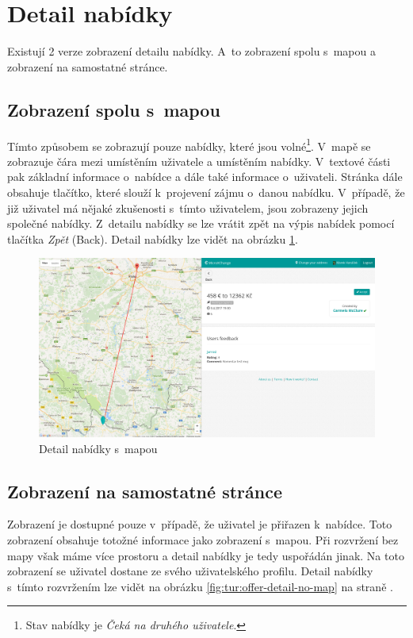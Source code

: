 \section{Detail nabídky}

\label{nur:detail}

Existují 2 verze zobrazení detailu nabídky. A~to zobrazení spolu s~mapou a zobrazení na samostatné stránce.

\subsection{Zobrazení spolu s~mapou}
Tímto způsobem se zobrazují pouze nabídky, které jsou volné\footnote{Stav nabídky je \textit{Čeká na druhého uživatele}.}. V~mapě se zobrazuje čára mezi umístěním uživatele a umístěním nabídky. V~textové části pak základní informace o~nabídce a dále také informace o~uživateli. Stránka dále obsahuje tlačítko, které slouží k~projevení zájmu o~danou nabídku. V~případě, že již uživatel má nějaké zkušenosti s~tímto uživatelem, jsou zobrazeny jejich společné nabídky. Z~detailu nabídky se lze vrátit zpět na výpis nabídek pomocí tlačítka \textit{Zpět} (Back). Detail nabídky lze vidět na obrázku \ref{fig:tur:offer-detail-map}.

\begin{figure}[!h]
    \centering
    \includegraphics[width=1.0\textwidth]{media/tur/offer-detail-map.png}
    \caption{Detail nabídky s~mapou}
    \label{fig:tur:offer-detail-map}
\end{figure}

\subsection{Zobrazení na samostatné stránce}
Zobrazení je dostupné pouze v~případě, že uživatel je přiřazen k~nabídce. Toto zobrazení obsahuje totožné informace jako zobrazení s~mapou. Při rozvržení bez mapy však máme více prostoru a detail nabídky je tedy uspořádán jinak. Na toto zobrazení se uživatel dostane ze svého uživatelského profilu. Detail nabídky s~tímto rozvržením lze vidět na obrázku \ref{fig:tur:offer-detail-no-map} na straně \pageref{fig:tur:offer-detail-no-map}.

